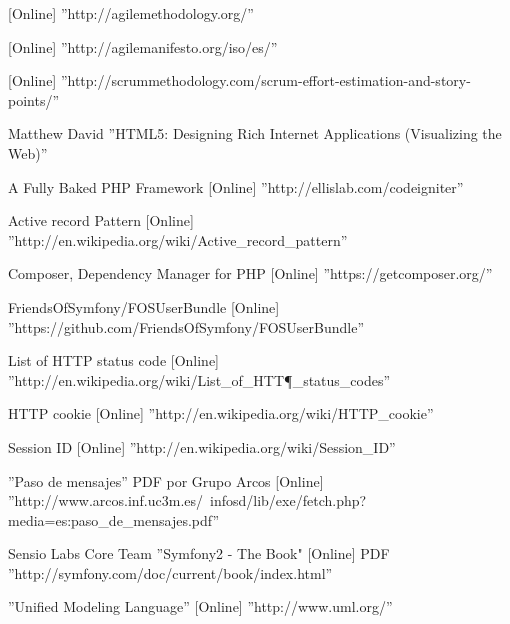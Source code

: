 \begin{thebibliography}{100}
 [Online] ''http://agilemethodology.org/''

 [Online] ''http://agilemanifesto.org/iso/es/''

 [Online] ''http://scrummethodology.com/scrum-effort-estimation-and-story-points/''

 Matthew David ''HTML5: Designing Rich Internet Applications (Visualizing the Web)''

 A Fully Baked PHP Framework [Online] ''http://ellislab.com/codeigniter''

 Active record Pattern [Online] ''http://en.wikipedia.org/wiki/Active_record_pattern''

 Composer, Dependency Manager for PHP [Online] ''https://getcomposer.org/''

 FriendsOfSymfony/FOSUserBundle [Online] ''https://github.com/FriendsOfSymfony/FOSUserBundle''

 List of HTTP status code [Online] ''http://en.wikipedia.org/wiki/List\_of\_HTT\P_status\_codes''

 HTTP cookie [Online] ''http://en.wikipedia.org/wiki/HTTP_cookie''

 Session ID [Online] ''http://en.wikipedia.org/wiki/Session_ID''

 ''Paso de mensajes'' PDF por Grupo Arcos [Online] ''http://www.arcos.inf.uc3m.es/~infosd/lib/exe/fetch.php?media=es:paso_de_mensajes.pdf''

 Sensio Labs Core Team ''Symfony2 - The Book" [Online] PDF ''http://symfony.com/doc/current/book/index.html''

 ''Unified Modeling Language'' [Online] ''http://www.uml.org/''

\end{thebibliography}
